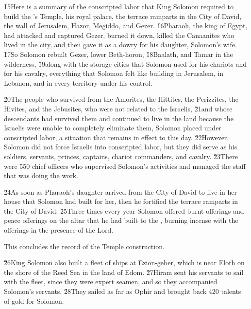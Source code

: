 \v{15}Here is a summary of the conscripted labor that King Solomon required to build the 's Temple, his royal palace, the terrace ramparts in the City of David, the wall of Jerusalem, Hazor, Megiddo, and Gezer. \v{16}Pharaoh, the king of Egypt, had attacked and captured Gezer, burned it down, killed the Canaanites who lived in the city, and then gave it as a dowry for his daughter, Solomon's wife. \v{17}So Solomon rebuilt Gezer, lower Beth-horon, \v{18}Baalath, and Tamar in the wilderness, \v{19}along with the storage cities that Solomon used for his chariots and for his cavalry, everything that Solomon felt like building in Jerusalem, in Lebanon, and in every territory under his control.

\v{20}The people who survived from the Amorites, the Hittites, the Perizzites, the Hivites, and the Jebusites, who were not related to the Israelis, \v{21}and whose descendants had survived them and continued to live in the land because the Israelis were unable to completely eliminate them, Solomon placed under conscripted labor, a situation that remains in effect to this day. \v{22}However, Solomon did not force Israelis into conscripted labor, but they did serve as his soldiers, servants, princes, captains, chariot commanders, and cavalry. \v{23}There were 550 chief officers who supervised Solomon's activities and managed the staff that was doing the work.

\v{24}As soon as Pharaoh's daughter arrived from the City of David to live in her house that Solomon had built for her, then he fortified the terrace ramparts in the City of David. \v{25}Three times every year Solomon offered burnt offerings and peace offerings on the altar that he had built to the , burning incense with the offerings in the presence of the Lord.

This concludes the record of the Temple construction.

\v{26}King Solomon also built a fleet of ships at Ezion-geber, which is near Eloth on the shore of the Reed Sea in the land of Edom. \v{27}Hiram sent his servants to sail with the fleet, since they were expert seamen, and so they accompanied Solomon's servants. \v{28}They sailed as far as Ophir and brought back 420 talents of gold for Solomon.


